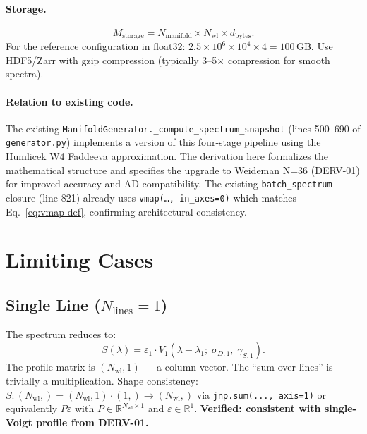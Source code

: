 \documentclass[11pt]{article}
\begin{document}
\paragraph{Storage.}
\begin{equation}
  M_\mathrm{storage} = N_\mathrm{manifold} \times N_\mathrm{wl} \times d_\mathrm{bytes}.
\end{equation}
For the reference configuration in float32:
$2.5\times10^6 \times 10^4 \times 4 = 100$\,GB. Use HDF5/Zarr with
gzip compression (typically 3--5$\times$ compression for smooth spectra).

\paragraph{Relation to existing code.}
The existing \texttt{ManifoldGenerator.\_compute\_spectrum\_snapshot}
(lines 500--690 of \texttt{generator.py}) implements a version of this
four-stage pipeline using the Humlicek W4 Faddeeva approximation. The
derivation here formalizes the mathematical structure and specifies the
upgrade to Weideman N=36 (DERV-01) for improved accuracy and AD compatibility.
The existing \texttt{batch\_spectrum} closure (line 821) already uses
\texttt{vmap(\ldots, in\_axes=0)} which matches Eq.~\eqref{eq:vmap-def},
confirming architectural consistency.


\section{Limiting Cases}
\label{sec:limits}

\subsection{Single Line ($N_\mathrm{lines} = 1$)}

The spectrum reduces to:
\begin{equation}
  S(\lambda) = \varepsilon_1 \cdot V_1(\lambda - \lambda_1;\;\sigma_{D,1},\;\gamma_{S,1}).
\end{equation}
The profile matrix is $(N_\mathrm{wl}, 1)$ --- a column vector. The
``sum over lines'' is trivially a multiplication. Shape consistency:
$S\colon (N_\mathrm{wl},) = (N_\mathrm{wl}, 1) \cdot (1,) \to (N_\mathrm{wl},)$
via \texttt{jnp.sum(..., axis=1)} or equivalently $P\varepsilon$ with
$P \in \mathbb{R}^{N_\mathrm{wl}\times 1}$ and $\varepsilon \in \mathbb{R}^1$.
\textbf{Verified: consistent with single-Voigt profile from DERV-01.}
\end{document}
